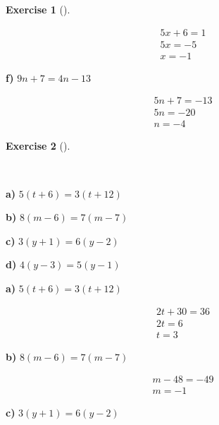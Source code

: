 \documentclass[
  letterpaper,
  DIV=11,
  numbers=noendperiod]{scrreprt}
\theoremstyle{definition}
\newtheorem{exercise}{Exercise}[chapter]
\theoremstyle{remark}
\begin{document}
\begin{exercise}[]
\begin{tcolorbox}
\begin{align*}
5x + 6 = 1 \\ 5x = -5 \\ x = -1
\end{align*}

\textbf{f)} \(\displaystyle 9n + 7 = 4n - 13\)

\begin{align*}
5n + 7 = -13 \\ 5n = -20 \\ n = -4
\end{align*}

\end{tcolorbox}

\end{exercise}

\begin{exercise}[]\protect\hypertarget{exr-u5-8}{}\label{exr-u5-8}

~

\textbf{a)} \(\displaystyle 5(t + 6) = 3(t + 12)\)

\textbf{b)} \(\displaystyle 8(m - 6) = 7(m - 7)\)

\textbf{c)} \(\displaystyle 3(y + 1) = 6(y - 2)\)

\textbf{d)} \(\displaystyle 4(y - 3) = 5(y - 1)\)

\begin{tcolorbox}[enhanced jigsaw, opacitybacktitle=0.6, coltitle=black, arc=.35mm, colframe=quarto-callout-tip-color-frame, colback=white, bottomrule=.15mm, left=2mm, colbacktitle=quarto-callout-tip-color!10!white, titlerule=0mm, opacityback=0, title=\textcolor{quarto-callout-tip-color}{\faLightbulb}\hspace{0.5em}{🔍 View Solutions}, leftrule=.75mm, breakable, rightrule=.15mm, bottomtitle=1mm, toptitle=1mm, toprule=.15mm]

\textbf{a)} \(\displaystyle 5(t + 6) = 3(t + 12)\)

\begin{align*}
2t + 30 = 36 \\ 2t = 6 \\ t = 3
\end{align*}

\textbf{b)} \(\displaystyle 8(m - 6) = 7(m - 7)\)

\begin{align*}
m - 48 = -49 \\ m = -1
\end{align*}

\textbf{c)} \(\displaystyle 3(y + 1) = 6(y - 2)\)


\end{tcolorbox}
\end{exercise}
\end{document}
